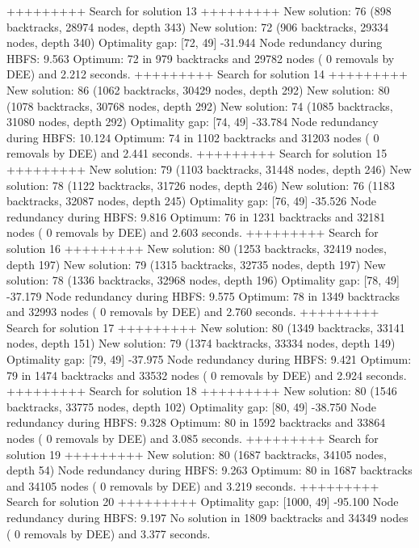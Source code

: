 \begin{enumerate}
{\begin{DoxyCode}
+++++++++ Search for solution 13 +++++++++
New solution: 76 (898 backtracks, 28974 nodes, depth 343)
New solution: 72 (906 backtracks, 29334 nodes, depth 340)
Optimality gap: [72, 49] -31.944 %
Node redundancy during HBFS: 9.563 %
Optimum: 72 in 979 backtracks and 29782 nodes ( 0 removals by DEE) and 2.212 seconds.
+++++++++ Search for solution 14 +++++++++
New solution: 86 (1062 backtracks, 30429 nodes, depth 292)
New solution: 80 (1078 backtracks, 30768 nodes, depth 292)
New solution: 74 (1085 backtracks, 31080 nodes, depth 292)
Optimality gap: [74, 49] -33.784 %
Node redundancy during HBFS: 10.124 %
Optimum: 74 in 1102 backtracks and 31203 nodes ( 0 removals by DEE) and 2.441 seconds.
+++++++++ Search for solution 15 +++++++++
New solution: 79 (1103 backtracks, 31448 nodes, depth 246)
New solution: 78 (1122 backtracks, 31726 nodes, depth 246)
New solution: 76 (1183 backtracks, 32087 nodes, depth 245)
Optimality gap: [76, 49] -35.526 %
Node redundancy during HBFS: 9.816 %
Optimum: 76 in 1231 backtracks and 32181 nodes ( 0 removals by DEE) and 2.603 seconds.
+++++++++ Search for solution 16 +++++++++
New solution: 80 (1253 backtracks, 32419 nodes, depth 197)
New solution: 79 (1315 backtracks, 32735 nodes, depth 197)
New solution: 78 (1336 backtracks, 32968 nodes, depth 196)
Optimality gap: [78, 49] -37.179 %
Node redundancy during HBFS: 9.575 %
Optimum: 78 in 1349 backtracks and 32993 nodes ( 0 removals by DEE) and 2.760 seconds.
+++++++++ Search for solution 17 +++++++++
New solution: 80 (1349 backtracks, 33141 nodes, depth 151)
New solution: 79 (1374 backtracks, 33334 nodes, depth 149)
Optimality gap: [79, 49] -37.975 %
Node redundancy during HBFS: 9.421 %
Optimum: 79 in 1474 backtracks and 33532 nodes ( 0 removals by DEE) and 2.924 seconds.
+++++++++ Search for solution 18 +++++++++
New solution: 80 (1546 backtracks, 33775 nodes, depth 102)
Optimality gap: [80, 49] -38.750 %
Node redundancy during HBFS: 9.328 %
Optimum: 80 in 1592 backtracks and 33864 nodes ( 0 removals by DEE) and 3.085 seconds.
+++++++++ Search for solution 19 +++++++++
New solution: 80 (1687 backtracks, 34105 nodes, depth 54)
Node redundancy during HBFS: 9.263 %
Optimum: 80 in 1687 backtracks and 34105 nodes ( 0 removals by DEE) and 3.219 seconds.
+++++++++ Search for solution 20 +++++++++
Optimality gap: [1000, 49] -95.100 %
Node redundancy during HBFS: 9.197 %
No solution in 1809 backtracks and 34349 nodes ( 0 removals by DEE) and 3.377 seconds.

\end{DoxyCode}}
\end{enumerate}
